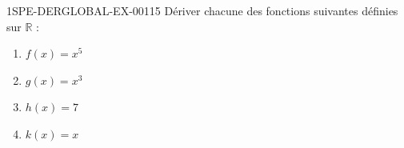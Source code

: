 \begin{exercice}{1SPE-DERGLOBAL-EX-001}{1}{5}
Dériver chacune des fonctions suivantes définies sur $\mathbb{R}$ :
\begin{enumerate}
  \item $f(x) = x^5$
  \item $g(x) = x^3$
  \item $h(x) = 7$
  \item $k(x) = x$
\end{enumerate}
\end{exercice}
